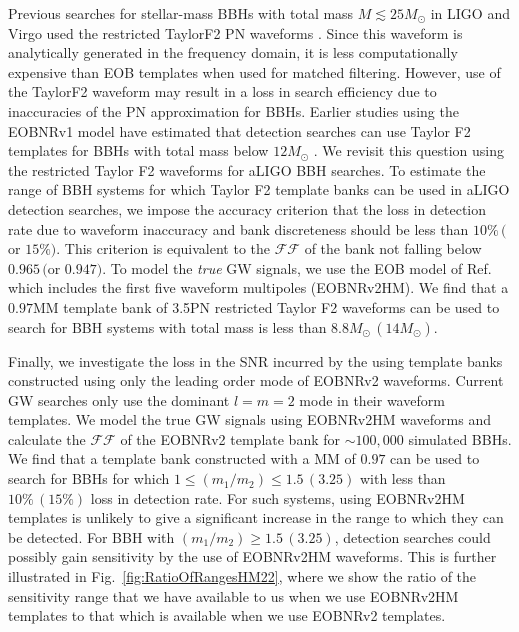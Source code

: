 \documentclass[aps,
prd,
amsmath,
amssymb,
twocolumn,
floatfix,
groupedaddress]{revtex4-1}
\newcommand{\FF}{\mathcal{FF}}
\newcommand{\MM}{\mathrm{MM}}
\def\l({\left(}
\def\r){\right)}
\begin{document}
Previous searches for stellar-mass BBHs  with total mass $M \lesssim 25 M_\odot$ in LIGO and Virgo used the restricted TaylorF2 PN waveforms  \citep{Sathyaprakash:1991mt,Cutler:1994ys,Droz:1999qx}. Since this waveform is analytically generated in the frequency domain, it is less computationally expensive than EOB templates when used for matched filtering. However, use of the TaylorF2 waveform may result in a loss in search efficiency due to inaccuracies of the PN approximation for BBHs. Earlier studies using the EOBNRv1 model \citep{Buonanno:2007pf,Buonanno:2002ft} have estimated that detection searches can use Taylor F2 templates for BBHs with total mass below $12M_{\odot}$ \citep{CompTemplates2009}. We revisit this question using the restricted Taylor F2 waveforms for aLIGO BBH searches. To estimate the range of BBH systems for which Taylor F2 template banks can be used in aLIGO detection searches, we impose the accuracy criterion that the loss in detection rate due to waveform inaccuracy and bank 
discreteness should be less than $10\%\, ($or $15\%)$. This criterion is equivalent to the $\FF$ of the bank not falling below $0.965\, ($or $0.947)$. To model the \textit{true} GW signals, we use the EOB model of Ref.~\citep{BuonannoEOBv2Main} which includes the first five waveform multipoles (EOBNRv2HM). We find that a $0.97\MM$ template bank of 3.5PN restricted Taylor F2 waveforms can be used to search for BBH systems with total mass is less than $8.8M_{\odot}\, (14M_{\odot})$.

Finally, we investigate the loss in the SNR incurred by the using template banks constructed using only the leading order mode of EOBNRv2 waveforms. Current GW searches only use the dominant $l=m=2$ mode in their waveform templates. We model the true GW signals using EOBNRv2HM waveforms and calculate the $\FF$ of the EOBNRv2 template bank for $\sim 100,000$ simulated BBHs. We find that a template bank constructed with a $\MM$ of $0.97$ can be used to search for BBHs for which $1\leq \l(m_1/m_2\r)\leq 1.5\, (3.25)$ with less than $10\%\, (15\%)$ loss in detection rate. For such systems, using EOBNRv2HM templates is unlikely to give a significant increase in the range to which they can be detected. For BBH with $\l(m_1/m_2\r)\geq 1.5\, (3.25)$, detection searches could possibly gain sensitivity by the use of EOBNRv2HM waveforms. This is further illustrated in Fig.~\ref{fig:RatioOfRangesHM22}, where we show the ratio of the sensitivity range that we have available to us when we use EOBNRv2HM templates to that 
which is available when we use EOBNRv2 templates.
\end{document}

